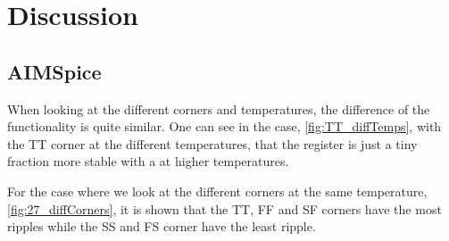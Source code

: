 \section{Discussion}
\label{sec: Discussion}


\subsection{AIMSpice}

When looking at the different corners and temperatures, the difference of the functionality is quite similar. One can see in the case, \autoref{fig:TT_diffTemps}, with the TT corner at the different temperatures, that the register is just a tiny fraction more stable with a at higher temperatures.

For the case where we look at the different corners at the same temperature, \autoref{fig:27_diffCorners}, it is shown that the TT, FF and SF corners have the most ripples while the SS and FS corner have the least ripple.



